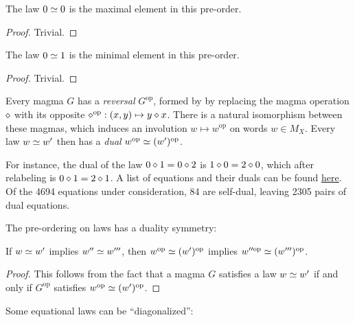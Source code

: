\begin{lemma}\label{maximal}\leanok The law $0  \simeq  0$ is the maximal element in this pre-order.
\end{lemma}

\begin{proof} Trivial.
\end{proof}

\begin{lemma}\label{minimal}\leanok  The law $0  \simeq  1$ is the minimal element in this pre-order.
\end{lemma}

\begin{proof} Trivial.
\end{proof}

Every magma $G$ has a \emph{reversal} $G^{\mathrm{op}}$, formed by by replacing the magma operation $\diamond$ with its opposite $\diamond^{\mathrm{op}}:(x,y) \mapsto y \diamond x$. There is a natural isomorphism between these magmas, which induces an involution $w \mapsto w^{\mathrm{op}}$ on words $w \in M_X$.  Every law $w  \simeq  w'$ then has a \emph{dual} $w^{\mathrm{op}}  \simeq  (w')^{\mathrm{op}}$.

For instance, the dual of the law $0 \diamond 1 = 0 \diamond 2$ is $1 \diamond 0 = 2 \diamond 0$, which after relabeling is $0 \diamond 1 = 2 \diamond 1$.  A list of equations and their duals can be found \href{https://github.com/teorth/equational_theories/blob/main/data/dual_equations.md}{here}.  Of the 4694 equations under consideration, 84 are self-dual, leaving 2305 pairs of dual equations.

The pre-ordering on laws has a duality symmetry:

\begin{lemma}\leanok\label{duality}  If $w  \simeq  w'$ implies $w''  \simeq  w'''$, then $w^{\mathrm{op}}  \simeq  (w')^{\mathrm{op}}$ implies $w''^{\mathrm{op}}  \simeq  (w''')^{\mathrm{op}}$.
\end{lemma}

\begin{proof} This follows from the fact that a magma $G$ satisfies a law $w  \simeq  w'$ if and only if $G^{\mathrm{op}}$ satisfies $w^{\mathrm{op}}  \simeq  (w')^{\mathrm{op}}$.
\end{proof}

Some equational laws can be ``diagonalized'':

